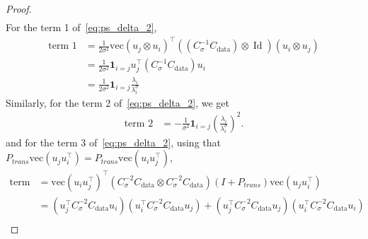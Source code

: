 \documentclass[11pt]{article}
\newcommand{\id}{\operatorname{Id}}
\begin{document}
\begin{proof}
\begin{align}
    \end{align}
For the term 1 of~\eqref{eq:ps_delta_2}, %
 \begin{align*}
 \text{term 1} %
 &= \frac{1}{2\sigma^2}\text{vec}(u_j \otimes u_i)^\top (\left( C_\sigma^{-1} C_\mathrm{data} \right) \otimes \id) (u_i \otimes u_j) \\
    &= \frac{1}{2\sigma^2} \mathbf{1}_{i=j} u_j^\top \left( C_\sigma^{-1} C_\mathrm{data} \right) u_i  \\
    &=  \frac{1}{2\sigma^2} \mathbf{1}_{i=j} \frac{\lambda_i}{\lambda^\sigma_i}
\end{align*}
Similarly, for the term 2 of~\eqref{eq:ps_delta_2}, we get 
\begin{align*}
    \text{term 2} &= - \frac{1}{\sigma^2} \mathbf{1}_{i=j}\left( \frac{\lambda_i}{\lambda^\sigma_i}\right)^2.
\end{align*}
and for the term 3 of~\eqref{eq:ps_delta_2}, using that $ P_{trans} \text{vec}(u_j u_i^\top) =  P_{trans} \text{vec}(u_i u_j^\top)$,
\begin{align*}
      \text{term 3}  &= \text{vec}(u_i u_j^\top)^\top (C_\sigma^{-2} C_\mathrm{data} \otimes C_\sigma^{-2} C_\mathrm{data})(I + P_{trans}) \text{vec}(u_j u_i^\top) \\
    &= (u_j^\top C_\sigma^{-2} C_\mathrm{data} u_i) (u_i^\top C_\sigma^{-2} C_\mathrm{data}  u_j) + (u_j^\top C_\sigma^{-2} C_\mathrm{data} u_j) (u_i^\top  C_\sigma^{-2} C_\mathrm{data} u_i) \\

\end{align*}
\end{proof}
\end{document}
